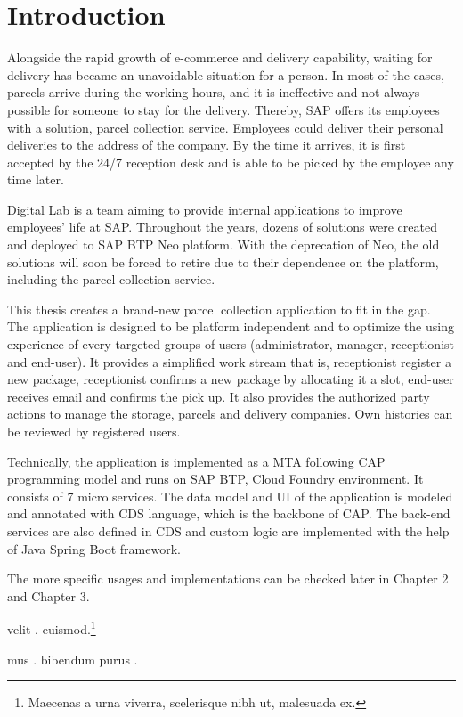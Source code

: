 \chapter{Introduction}
\label{ch:intro}

Alongside the rapid growth of e-commerce and delivery capability, waiting for delivery has became an unavoidable situation for a person. In most of the cases, parcels arrive during the working hours, and it is ineffective and not always possible for someone to stay for the delivery. Thereby, SAP offers its employees with a solution, parcel collection service. Employees could deliver their personal deliveries to the address of the company. By the time it arrives, it is first accepted by the 24/7 reception desk and is able to be picked by the employee any time later.

Digital Lab is a team aiming to provide internal applications to improve employees' life at SAP. Throughout the years, dozens of solutions were created and deployed to SAP BTP Neo platform. With the deprecation of Neo, the old solutions will soon be forced to retire due to their dependence on the platform, including the parcel collection service.

This thesis creates a brand-new parcel collection application to fit in the gap. The application is designed to be platform independent and to optimize the using experience of every targeted groups of users (administrator, manager, receptionist and end-user). It provides a simplified work stream that is, receptionist register a new package, receptionist confirms a new package by allocating it a slot, end-user receives email and confirms the pick up. It also provides the authorized party actions to manage the storage, parcels and delivery companies. Own histories can be reviewed by registered users.

Technically, the application is implemented as a MTA following CAP programming model and runs on SAP BTP, Cloud Foundry environment. It consists of 7 micro services. The data model and UI of the application is modeled and annotated with CDS language, which is the backbone of CAP. The back-end services are also defined in CDS and custom logic are implemented with the help of Java Spring Boot framework. 

The more specific usages and implementations can be checked later in Chapter 2 and Chapter 3.

 velit \cite{dahl1972structured}. euismod.\footnote{Maecenas a urna viverra, scelerisque nibh ut, malesuada ex.}

 mus \cite{cormen2009algorithms,krasner1988mvc}. bibendum  \citeauthor{dijkstra1979goto}  purus \cite{dijkstra1979goto}. 
